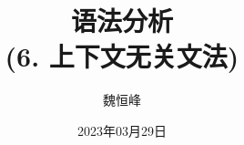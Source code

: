 \documentclass[]{beamer}
\title[语法分析]{语法分析 \\ (6. 上下文无关文法)}
\author[魏恒峰]{\large 魏恒峰}
\institute{hfwei@nju.edu.cn}
\date{2023年03月29日}
\begin{document}
\maketitle




\thankyou{}

\end{document}
